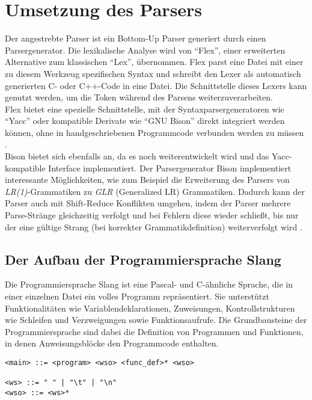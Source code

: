 \chapter{Umsetzung des Parsers}
\label{chap:building:parser}

Der angestrebte Parser ist ein Bottom-Up Parser generiert durch einen Parsergenerator.
Die lexikalische Analyse wird von ``Flex'', einer erweiterten Alternative zum klassischen ``Lex'', übernommen.
Flex parst eine Datei mit einer zu diesem Werkzeug spezifischen Syntax und schreibt den Lexer als automatisch generierten C- oder C++-Code in eine Datei.
Die Schnittstelle dieses Lexers kann genutzt werden, um die Token während des Parsens weiterzuverarbeiten.\\
Flex bietet eine spezielle Schnittstelle, mit der Syntaxparsergeneratoren wie ``Yacc'' oder kompatible Derivate wie ``GNU Bison'' direkt integriert werden können, ohne in handgeschriebenen Programmcode verbunden werden zu müssen \cite{flex:1995}.\\
Bison bietet sich ebenfalls an, da es noch weiterentwickelt wird und das Yacc-kompatible Interface implementiert.
Der Parsergenerator Bison implementiert interessante Möglichkeiten, wie zum Beispiel die Erweiterung des Parsers von \textit{LR(1)}-Grammatiken zu \textit{GLR} (Generalized LR) Grammatiken.
Dadurch kann der Parser auch mit Shift-Reduce Konflikten umgehen, indem der Parser mehrere Parse-Stränge gleichzeitig verfolgt und bei Fehlern diese wieder schließt, bis nur der eine gültige Strang (bei korrekter Grammatikdefinition) weiterverfolgt wird \cite{bisonmanual}.\\

\section{Der Aufbau der Programmiersprache Slang}

Die Programmiersprache Slang ist eine Pascal- und C-ähnliche Sprache, die in einer einzelnen Datei ein volles Programm repräsentiert.
Sie unterstützt Funktionalitäten wie Variablendeklarationen, Zuweisungen, Kontrollstrukturen wie Schleifen und Verzweigungen sowie Funktionsaufrufe.
Die Grundbausteine der Programmiersprache sind dabei die Definition von Programmen und Funktionen, in denen Anweisungsblöcke den Programmcode enthalten.
\begin{lstlisting}[caption={Grammatikdefinition Einsprungspunkt}]
<main> ::= <program> <wso> <func_def>* <wso>

<ws> ::= " " | "\t" | "\n"
<wso> ::= <ws>*
\end{lstlisting}

